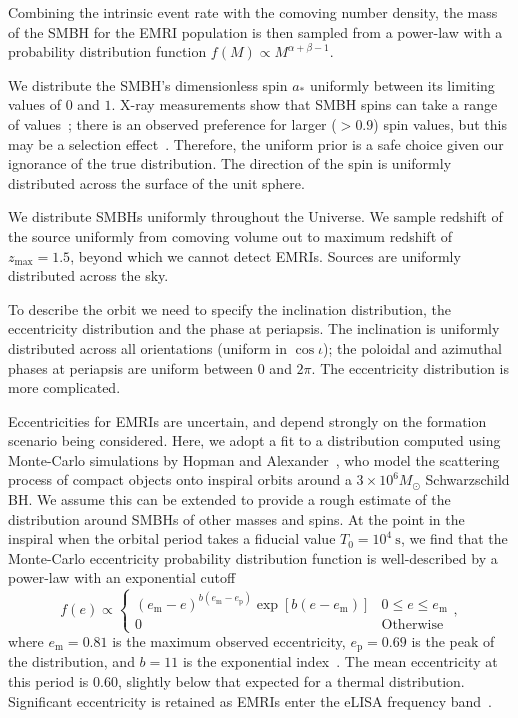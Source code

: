\documentclass[aps,prd,amsfonts,amssymb,amsmath,nofootinbib,showpacs,superscriptaddress,twocolumn,floatfix]{revtex4-1}
\newcommand{\sub}[1]{\ensuremath{_\mathrm{#1}}}
\begin{document}
Combining the intrinsic event rate with the comoving number density, the mass of the SMBH for the EMRI population is then sampled from a power-law with a probability distribution function $f(M) \propto M^{\alpha+\beta-1}$.

We distribute the SMBH's dimensionless spin $a_\ast$ uniformly between its limiting values of $0$ and $1$. X-ray measurements show that SMBH spins can take a range of values~\cite{Reynolds2013a,Patrick2012,Walton2013,BerryThesis2013}; there is an observed preference for larger ($> 0.9$) spin values, but this may be a selection effect~\cite{Brenneman2011}. Therefore, the uniform prior is a safe choice given our ignorance of the true distribution. The direction of the spin is uniformly distributed across the surface of the unit sphere.

We distribute SMBHs uniformly throughout the Universe. We sample redshift of the source uniformly from comoving volume out to maximum redshift of $z\sub{max} = 1.5$, beyond which we cannot detect EMRIs. Sources are uniformly distributed across the sky. 

To describe the orbit we need to specify the inclination distribution, the eccentricity distribution and the   phase at periapsis. The inclination is uniformly distributed across all orientations (uniform in $\cos \iota$); the poloidal and azimuthal phases at periapsis are uniform between $0$ and $2\pi$. The eccentricity distribution is more complicated.

Eccentricities for EMRIs are uncertain, and depend strongly on the formation scenario being considered. Here, we adopt a fit to a distribution computed using Monte-Carlo simulations by Hopman and Alexander~\cite{Hopman2005}, who model the scattering process of compact objects onto inspiral orbits around a $3 \times 10^6 M_\odot$ Schwarzschild BH. We assume this can be extended to provide a rough estimate of the distribution around SMBHs of other masses and spins. At the point in the inspiral when the orbital period takes a fiducial value $T_0 = 10^4~\mathrm{s}$, we find that the Monte-Carlo eccentricity probability distribution function is well-described by a power-law with an exponential cutoff
\begin{equation}
\label{eq:EMRI-e-distribution}
f(e) \propto 
	\begin{cases}
		\left(e\sub{m}-e\right)^{b(e\sub{m}-e\sub{p})} \exp\left[b(e-e\sub{m})\right] & 0 \leq e \leq e\sub{m}\\
		0 & \mathrm{Otherwise}
	\end{cases},
\end{equation}
where $e\sub{m} = 0.81$ is the maximum observed eccentricity, $e\sub{p} = 0.69$ is the peak of the distribution, and $b=11$ is the exponential index~\cite{ColeThesis2015}. The mean eccentricity at this period is $0.60$, slightly below that expected for a thermal distribution. Significant eccentricity is retained as EMRIs enter the eLISA frequency band~\cite{Merritt2015c}. 
\end{document}
